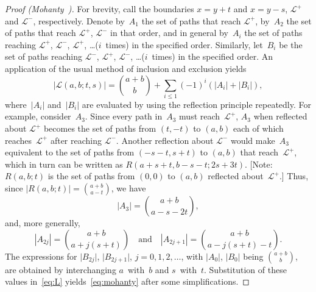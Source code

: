 \documentclass[11pt]{article}
\begin{document}
\begin{proof}[Proof {\rm (Mohanty~\cite{Mohanty:1979})}]
 For brevity, call the boundaries \(x=y+t\) and
  \(x=y-s\), \(\mathcal{L}^{+}\) and \(\mathcal{L}^{-}\),
  respectively. Denote by~\(A_1\) the set of paths that reach
  \(\mathcal{L}^{+}\), by~\(A_2\) the set of paths that reach
  \(\mathcal{L}^{+}\), \(\mathcal{L}^{-}\) in that order, and in
  general by~\(A_i\) the set of paths reaching \(\mathcal{L}^{+}\),
  \(\mathcal{L}^{-}\), \(\mathcal{L}^{+}\), \ldots\@ (\(i\)~times) in
  the specified order. Similarly, let~\(B_i\) be the set of paths
  reaching \(\mathcal{L}^{-}\), \(\mathcal{L}^{+}\),
  \(\mathcal{L}^{-}\), \ldots\@ (\(i\)~times) in the specified order. An
  application of the usual method of inclusion and exclusion yields
\begin{equation}
\left\lvert\mathcal{L}(a,b;t,s)\right\rvert = \binom{a+b}{b} + \sum_{i
\leqslant 1}(-1)^{i}(\lvert{A_i}\rvert + \lvert{B_i}\rvert),
\label{eq:L}
\end{equation}
where~\(\lvert{A_i}\rvert\) and~\(\lvert{B_i}\rvert\) are evaluated by
using the reflection principle repeatedly. For example,
consider~\(A_3\). Since every path in~\(A_3\) must
reach~\(\mathcal{L}^{+}\), \(A_3\) when reflected about
\(\mathcal{L}^{+}\) becomes the set of paths from \((t,-t)\) to
\((a,b)\) each of which reaches~\(\mathcal{L}^{+}\) after reaching
\(\mathcal{L}^{-}\). Another reflection about \(\mathcal{L}^{-}\)
would make~\(A_3\) equivalent to the set of paths from \((-s-t,s+t)\)
to \((a,b)\) that reach~\(\mathcal{L}^{+}\), which in turn can be
written as \(R(a+s+t,b-s-t; 2s+3t)\). [Note: \(R(a,b;t)\) is the set
  of paths from \((0,0)\) to \((a,b)\) reflected
  about~\(\mathcal{L}^{+}\).] Thus, since \(\lvert{R(a,b;t)}\rvert =
\binom{a+b}{a-t}\), we have
\begin{equation*}
\left\lvert{A_3}\right\rvert = \binom{a+b}{a-s-2t},
\end{equation*}
and, more generally,
\begin{equation*}
\left\lvert{A_{2j}}\right\rvert = \binom{a+b}{a+j(s+t)}
\quad\text{and}\quad
\left\lvert{A_{2j+1}}\right\rvert = \binom{a+b}{a-j(s+t)-t}.
\end{equation*}
The expressions for \(\lvert{B_{2j}}\rvert\),
\(\lvert{B_{2j+1}}\rvert\), \(j=0, 1, 2, \dots\), with
\(\lvert{A_0}\rvert\), \(\lvert{B_0}\rvert\) being \(\binom{a+b}{b}\),
are obtained by interchanging \(a\)~with~\(b\) and
\(s\)~with~\(t\). Substitution of these values in~\eqref{eq:L}
yields~\eqref{eq:mohanty} after some simplifications.
\end{proof}
\end{document}
